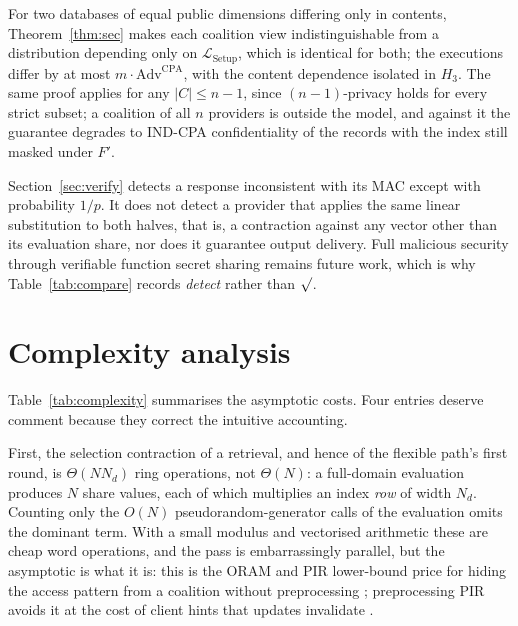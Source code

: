 \documentclass[a4paper,fleqn]{cas-dc}
\providecommand{\checkmark}{\ensuremath{\surd}}
\newcommand{\Leak}{\mathcal{L}}
\begin{document}
\begin{remark}
For two databases of equal public dimensions differing only in contents,
Theorem~\ref{thm:sec} makes each coalition view indistinguishable from a
distribution depending only on $\Leak_{\mathrm{Setup}}$, which is identical
for both; the executions differ by at most $m\cdot\mathrm{Adv}^{\mathrm{CPA}}$,
with the content dependence isolated in $H_3$. The same proof applies for any
$|C|\le n-1$, since $(n{-}1)$-privacy holds for every strict subset; a
coalition of all $n$ providers is outside the model, and against it the
guarantee degrades to IND-CPA confidentiality of the records with the index
still masked under $F'$.
\end{remark}

\begin{remark}
Section~\ref{sec:verify} detects a response inconsistent with its MAC except
with probability $1/p$. It does not detect a provider that applies the same
linear substitution to both halves, that is, a contraction against any vector
other than its evaluation share, nor does it guarantee output delivery. Full
malicious security through verifiable function secret sharing remains future
work, which is why Table~\ref{tab:compare} records \emph{detect} rather than
$\checkmark$.
\end{remark}

\section{Complexity analysis}
\label{sec:complexity}

Table~\ref{tab:complexity} summarises the asymptotic costs. Four entries
deserve comment because they correct the intuitive accounting.

First, the selection contraction of a retrieval, and hence of the flexible
path's first round, is $\Theta(N N_d)$ ring
operations, not $\Theta(N)$: a full-domain evaluation produces $N$ share
values, each of which multiplies an index \emph{row} of width $N_d$. Counting
only the $O(N)$ pseudorandom-generator calls of the evaluation omits the
dominant term. With a small modulus and vectorised arithmetic these are cheap
word operations, and the pass is embarrassingly parallel, but the asymptotic
is what it is: this is the ORAM and PIR lower-bound price for hiding the
access pattern from a coalition without preprocessing
\citep{goldreich1996software,beimel2000reducing}; preprocessing PIR avoids it
at the cost of client hints that updates invalidate
\citep{corrigan2020private}.
\end{document}
